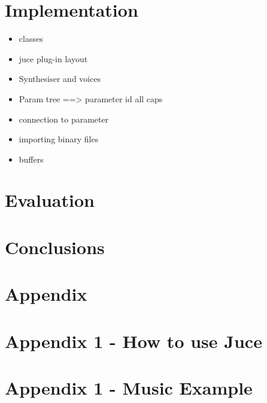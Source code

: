 \documentclass{article}
\begin{document}
	
	\section{Implementation}
	
	\begin{itemize}
		\item classes
		\item juce plug-in layout
		\item Synthesiser and voices
		\item Param tree ==> parameter id all caps
		\item connection to parameter
		\item importing binary files
		\item buffers
	\end{itemize}
	

	
	\section{Evaluation}
	
	\section{Conclusions}
	
	\section{Appendix}
	\section{Appendix 1 - How to use Juce}
	\section{Appendix 1 - Music Example}
	
\end{document}
